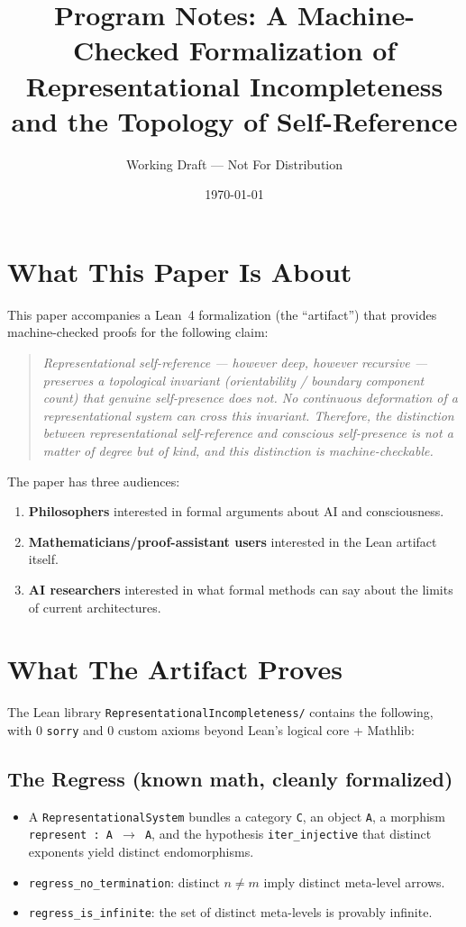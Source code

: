 \documentclass[11pt]{article}
\title{Program Notes: A Machine-Checked Formalization of\\
Representational Incompleteness and the Topology of Self-Reference}
\author{Working Draft — Not For Distribution}
\date{\today}
\begin{document}
\maketitle

\section{What This Paper Is About}

This paper accompanies a Lean~4 formalization (the ``artifact'') that provides
machine-checked proofs for the following claim:

\begin{quote}
\emph{Representational self-reference --- however deep, however recursive --- preserves
a topological invariant (orientability / boundary component count) that genuine
self-presence does not. No continuous deformation of a representational system can
cross this invariant. Therefore, the distinction between representational
self-reference and conscious self-presence is not a matter of degree but of kind,
and this distinction is machine-checkable.}
\end{quote}

The paper has three audiences:
\begin{enumerate}
\item \textbf{Philosophers} interested in formal arguments about AI and consciousness.
\item \textbf{Mathematicians/proof-assistant users} interested in the Lean artifact itself.
\item \textbf{AI researchers} interested in what formal methods can say about the limits of current architectures.
\end{enumerate}

\section{What The Artifact Proves}

The Lean library \texttt{RepresentationalIncompleteness/} contains the following, with 0 \texttt{sorry}
and 0 custom axioms beyond Lean's logical core + Mathlib:

\subsection{The Regress (known math, cleanly formalized)}

\begin{itemize}
\item A \texttt{RepresentationalSystem} bundles a category \texttt{C}, an object \texttt{A},
  a morphism \texttt{represent : A $\to$ A}, and the hypothesis \texttt{iter\_injective}
  that distinct exponents yield distinct endomorphisms.
\item \texttt{regress\_no\_termination}: distinct $n \neq m$ imply distinct meta-level arrows.
\item \texttt{regress\_is\_infinite}: the set of distinct meta-levels is provably infinite.
\end{itemize}
\end{document}
